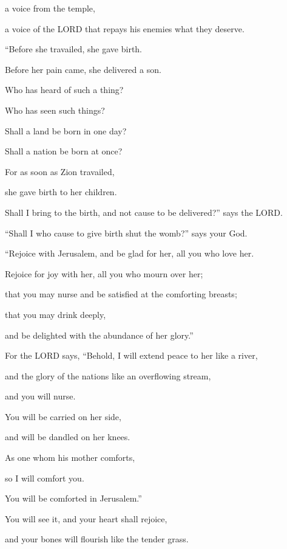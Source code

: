 a voice from the temple,

a voice of the LORD that repays his enemies what they deserve.


\vspace{\baselineskip} \myverse{}“Before she travailed, she gave birth.

Before her pain came, she delivered a son.

\myverse{}Who has heard of such a thing?

Who has seen such things?

Shall a land be born in one day?

Shall a nation be born at once?

For as soon as Zion travailed,

she gave birth to her children.

\myverse{}Shall I bring to the birth, and not cause to be delivered?” says
the LORD.

“Shall I who cause to give birth shut the womb?” says your God.


\vspace{\baselineskip} \myverse{}“Rejoice with Jerusalem, and be glad for her, all you who love
her.

Rejoice for joy with her, all you who mourn over her;

\myverse{}that you may nurse and be satisfied at the comforting breasts;

that you may drink deeply,

and be delighted with the abundance of her glory.”


\vspace{\baselineskip} \myverse{}For the LORD says, “Behold, I will extend peace to her like
a river,

and the glory of the nations like an overflowing stream,

and you will nurse.

You will be carried on her side,

and will be dandled on her knees.

\myverse{}As one whom his mother comforts,

so I will comfort you.

You will be comforted in Jerusalem.”


\vspace{\baselineskip} \myverse{}You will see it, and your heart shall rejoice,

and your bones will flourish like the tender grass.

